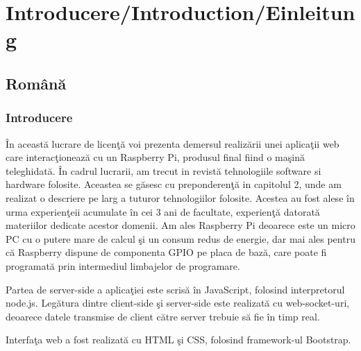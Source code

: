 
\chapter{Introducere/Introduction/Einleitung} %

\label{Chapter1} %


\section{Rom\^ an\u a}
\subsection{Introducere}


\^In aceast\u a lucrare de licen\c t\u a voi prezenta demersul realiz\u arii unei aplica\c tii web care interac\c tioneaz\u a cu un Raspberry Pi, produsul final fiind o ma\c sin\u a teleghidat\u a. \^ In cadrul lucrarii, am trecut in revist\u a tehnologiile software si hardware folosite. Aceastea se g\u asesc cu preponderen\c t\u a in capitolul 2, unde am realizat o descriere pe larg a tuturor tehnologiilor folosite. Acestea au fost alese \^ in urma experien\c teii acumulate \^ in cei 3 ani de facultate, experien\c t\u a datorat\u a materiilor dedicate acestor domenii. Am ales Raspberry Pi deoarece este un micro PC cu o putere mare de calcul \c si un consum redus de energie, dar mai ales pentru c\u a Raspberry dispune de componenta GPIO pe placa de baz\u a, care poate fi programat\u a prin intermediul  limbajelor de programare. 

Partea de server-side a aplica\c tiei este scris\u a \^ in JavaScript, folosind interpretorul node.js. Leg\u atura dintre client-side \c si server-side este realizat\u a cu web-socket-uri, deoarece datele transmise de client c\u atre server trebuie s\u a fie \^ in timp real.

Interfa\c ta web a fost realizat\u a cu HTML \c si CSS, folosind framework-ul Bootstrap.
\newpage
